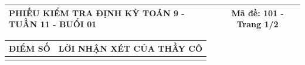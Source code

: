 \documentclass[12pt,a4paper]{article}
\begin{document}
\pagestyle{empty}
\noindent
\begin{tabularx}{\linewidth}{|X|c|}
\hline
\textbf{PHIẾU KIỂM TRA ĐỊNH KỲ TOÁN 9 - TUẦN 11 - BUỔI 01} & \textbf{Mã đề: 101 - Trang 1/2} \\
\hline
\end{tabularx}

\vspace{1.0mm}

\noindent
\begin{tabularx}{\linewidth}{|p{3.2cm}|X|}
\hline
\centering\textbf{ĐIỂM SỐ} & \centering\textbf{LỜI NHẬN XÉT CỦA THẦY CÔ} \tabularnewline
\hline
\rule{0pt}{1.8cm} & \tabularnewline
\hline
\end{tabularx}
\end{document}
